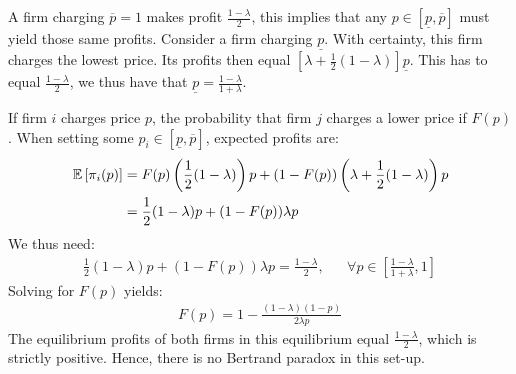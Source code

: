 A firm charging \(\overline{p}=1\) makes profit \(\frac{1-\lambda}{2}\),
this implies that any \(p\in\left[\underline{p},\overline{p}\right]\)
must yield those same profits. Consider a firm charging \(\underline{p}\).
With certainty, this firm charges the lowest price. Its profits then
equal \(\left[\lambda+ \frac{1}{2}(1-\lambda) \right]\underline{p}\).
This has to equal \(\frac{1-\lambda}{2}\), we thus have that
\(\underline{p}=\frac{1-\lambda}{1+\lambda}\).

If firm \(i\) charges price \(p\), the probability that firm \(j\) charges
a lower price if \(F(p)\). When setting some
\(p_i\in\left[\underline{p},\overline{p}\right]\), expected profits are:
\begin{align}
	\,\mathbb{E}\left[\pi_i(p)\right] & =F(p)\left(\frac{1}{2}(1-\lambda)\right)p+
	(1-F(p))\left(\lambda+\frac{1}{2}(1-\lambda)\right)p      \\
	             & =\frac{1}{2}(1-\lambda)p+(1-F(p))\lambda p
\end{align}
We thus need:
\begin{align}
	\frac{1}{2}(1-\lambda)p+(1-F(p))\lambda p=\frac{1-\lambda}{2}, &  &
	\forall p\in\left[\frac{1-\lambda}{1+\lambda},1\right]
\end{align}
Solving for \(F(p)\) yields:
\begin{align}
	F(p)=1-\frac{(1-\lambda)(1-p)}{2\lambda p}
\end{align}
The equilibrium profits of both firms in this equilibrium equal
\(\frac{1-\lambda}{2}\), which is strictly positive. Hence, there is no
Bertrand paradox in this set-up.

